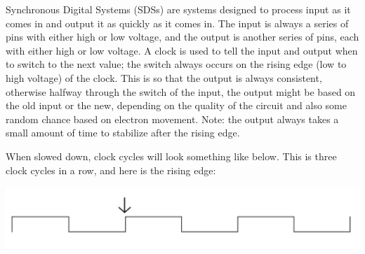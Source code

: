 \begin{blocksection}
Synchronous Digital Systems (SDSs) are systems designed to process input as it comes in and output it as quickly as it comes in.  The input is always a series of pins with either high or low voltage, and the output is another series of pins, each with either high or low voltage.  A clock is used to tell the input and output when to switch to the next value; the switch always occurs on the rising edge (low to high voltage) of the clock.  This is so that the output is always consistent, otherwise halfway through the switch of the input, the output might be based on the old input or the new, depending on the quality of the circuit and also some random chance based on electron movement.  Note: the output always takes a small amount of time to stabilize after the rising edge.

When slowed down, clock cycles will look something like below.  This is three clock cycles in a row, and here is the rising edge:

\includegraphics[width=\textwidth]{images/sds/explanation.png}

\end{blocksection}
